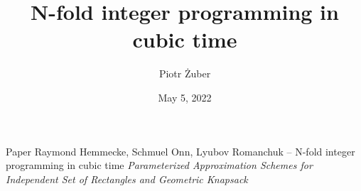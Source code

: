 \documentclass[handout,usenames,dvipsnames]{beamer}
\title{N-fold integer programming in cubic time} %
\author{Piotr Żuber} %
\institute[University of Warsaw] %
{
University of Warsaw
\\ %
\medskip
\textit{} %
}
\date{May 5, 2022} %
\begin{document}
\newtheorem{thm}{Theorem}
\newtheorem{defi}{Definition}
\newtheorem*{defi*}{Definition}
\newtheorem*{thm*}{Theorem}
\newtheorem{lm}{Lemma}
\newtheorem*{lm*}{Lemma}
\newtheorem{fakt}{Fact}
\newtheorem*{fakt*}{Fact}


\renewcommand{\a}{\alpha}
\newcommand{\e}{\varepsilon}
\newcommand{\E}{\mathbb{E}}
\renewcommand{\P}{\mathbb{P}}
\renewcommand{\b}{\beta}
\newcommand{\s}{\sigma}
\renewcommand{\S}{\Sigma}
\renewcommand{\t}{\tau}
\renewcommand{\t}{\theta}
\newcommand{\F}{\Phi}
\newcommand{\g}{\gamma}
\newcommand{\R}{\mathbb{R}}
\newcommand{\Z}{\mathbb{Z}}
\newcommand{\dis}{\displaystyle}
\newcommand{\vect}[1]{\textbf{#1}}
\newcommand{\maxnorm}[1]{\lVert #1 \rVert_{\infty}}
\newcommand{\norm}[1]{\lVert #1 \rVert}
\newcommand{\bigO}{\mathcal{O}}
\newcommand{\cord}{\sqsubseteq}
\newcommand{\graver}{\mathcal{G}}
\renewcommand{\figurename}{Figure}

\begin{frame}
\titlepage %
\end{frame}





\begin{frame}{Paper}
Raymond Hemmecke, Schmuel Onn, Lyubov Romanchuk -- N-fold integer programming in cubic time 
\textit{Parameterized Approximation Schemes for Independent Set of Rectangles and Geometric Knapsack}
\end{frame}
\end{document}
